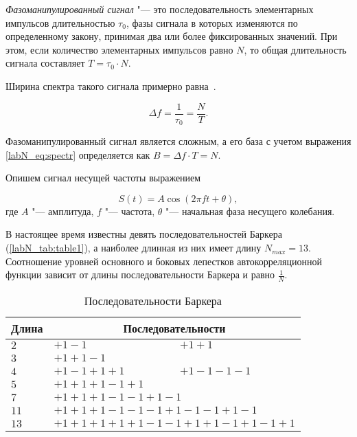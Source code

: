 
\emph{Фазоманипулированный сигнал} "--- это последовательность элементарных импульсов длительностью $\tau_0$, фазы сигнала в которых изменяются по определенному закону, принимая два или более фиксированных значений. При этом, если количество элементарных импульсов равно $N$, то общая длительность сигнала составляет $T=\tau_0\cdot N$. 


Ширина спектра такого сигнала примерно равна~\cite{Suzev}.


\begin{equation}
\Delta f= \frac{1}{\tau_0} = \frac{N}{T}.
\label{labN_eq:spectr}
\end{equation}
	
Фазоманипулированный сигнал является сложным, а его база с учетом выражения \eqref{labN_eq:spectr} определяется как $B = \Delta f \cdot T = N$.

	
Опишем сигнал несущей частоты выражением

\begin{equation}
S(t) = A\cos(2\pi f t +\theta), 
\label{labN_eq:carryf}
\end{equation}
где $A$ "--- амплитуда, $f$ "--- частота, $\theta$ "--- начальная фаза несущего колебания.
   
В настоящее время известны девять последовательностей Баркера (\autoref{labN_tab:table1}), а наиболее длинная из них имеет длину $N_{max}=13$. Соотношение уровней основного и боковых лепестков автокорреляционной функции зависит от длины последовательности Баркера и равно $\displaystyle \frac{1}{N}$.

\begin{table}[H]
\caption{Последовательности Баркера}
\label{labN_tab:table1}
\begin{tabular}{|p{1.2cm}|p{4cm}|p{4cm}|}
\hline
Длина & \multicolumn{2}{c|}{Последовательности} \\ \hline
$2$ & $+1 -1$ & $+1 +1$ \\ \hline
$3$ & \multicolumn{2}{l|}{$+1 +1 -1$} \\ \hline
$4$ & $+1 -1 +1 +1$ & $+1 -1 -1 -1$ \\ \hline
$5$ & \multicolumn{2}{l|}{$+1 +1 +1 -1 +1$} \\ \hline
$7$ & \multicolumn{2}{l|}{$+1 +1 +1 -1 -1 +1 -1$} \\ \hline
$11$ & \multicolumn{2}{l|}{$+1 +1 +1 -1 -1 -1 +1 -1 -1 +1 -1$} \\ \hline
$13$ & \multicolumn{2}{l|}{$+1 +1 +1 +1 +1 -1 -1 +1 +1 -1 +1 -1 +1$} \\ \hline
\end{tabular}
\end{table} 
	
